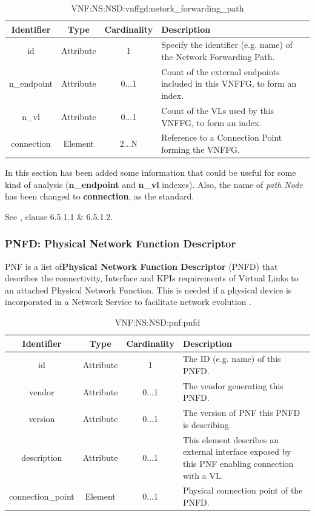 \documentclass[11pt, english]{article}
\begin{document}
\begin{table}[ht]
    \centering
    \begin{tabular}{c|c|c|m{7cm}}
    \hline
    Identifier & Type & Cardinality & Description \\
    \hline
    \rowcolor{Gray}
    id & Attribute & 1 & Specify the identifier (e.g. name) of the Network Forwarding Path. \\
    \hline
    n\_endpoint & Attribute & 0...1 & Count of the external endpoints included in this VNFFG, to form an index. \\
    \hline
    \rowcolor{Gray}
    n\_vl & Attribute & 0...1 & Count of the VLs used by this VNFFG, to form an index. \\
    \hline
    connection & Element & 2...N & Reference to a Connection Point forming the VNFFG. \\
    \hline
    \end{tabular}
    \caption{VNF:NS:NSD:vnffgd:netork\_forwarding\_path} \label{tab:tab11}
\end{table}

In this section has been added some information that could be useful for some kind of analysis (\textbf{n\_endpoint} and \textbf{n\_vl} indexes).
Also, the name of \textit{path Node} has been changed to \textbf{connection}, as the standard. 

See \cite{etsi}, clause 6.5.1.1 \& 6.5.1.2.

\subsubsection{PNFD: Physical Network Function Descriptor}
PNF is a list of\textbf{Physical Network Function Descriptor} (PNFD) that describes the connectivity, Interface and KPIs requirements of Virtual Links to an attached Physical Network Function. This is needed if a physical device is incorporated in a Network Service to facilitate network evolution \cite{etsi}.

\begin{table}[ht]
    \centering
    \begin{tabular}{c|c|c|m{7cm}}
    \hline
    Identifier & Type & Cardinality & Description \\
    \hline
    \rowcolor{Gray}
    id & Attribute & 1 & The ID (e.g. name) of this PNFD. \\
    \hline
    vendor & Attribute & 0...1 & The vendor generating this PNFD. \\
    \hline
    \rowcolor{Gray}
    version & Attribute & 0...1 & The version of PNF this PNFD is describing. \\
    \hline
    description & Attribute & 0...1 &  This element describes an external interface exposed by this PNF enabling connection with a VL. \\
    \hline
    \rowcolor{Gray}
    connection\_point & Element & 0...1 & Physical connection point of the PNFD. \\
    \hline
    \end{tabular}
    \caption{VNF:NS:NSD:pnf:pnfd} \label{tab:tab12}
\end{table}
\end{document}
